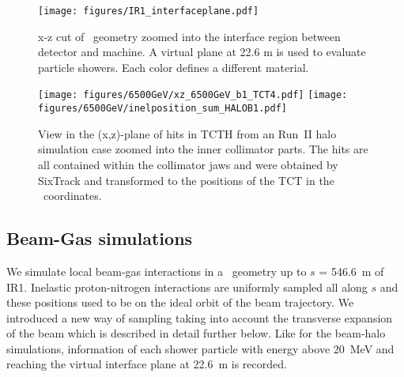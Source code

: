 

\begin{figure}%
\begin{center}
\texttt{[image: figures/IR1\_interfaceplane.pdf]}
\end{center}
\vspace{-0.6cm}
 \caption{x-z cut of \fluka~geometry zoomed into the interface region between detector and machine. A virtual plane at 22.6 m is used to evaluate particle showers. Each color defines a different material.
  \label{flukaGeo_nominal}}
\end{figure}


\begin{figure}%
\begin{center}
  \texttt{[image: figures/6500GeV/xz\_6500GeV\_b1\_TCT4.pdf]}
  \texttt{[image: figures/6500GeV/inelposition\_sum\_HALOB1.pdf]}
\end{center}
\vspace{-0.6cm}
 \caption{View in the (x,z)-plane of hits in TCTH from an Run~II halo simulation case zoomed into the inner collimator parts. The hits are all contained within the collimator jaws and were obtained by SixTrack and transformed to the positions of the TCT in the \fluka~coordinates.
  \label{tctHits}}
\end{figure}


\subsection{Beam-Gas simulations \label{BGdescript}}

We simulate local beam-gas interactions in a \fluka~geometry up to $s$ = 546.6~m of IR1. Inelastic proton-nitrogen interactions are uniformly sampled all along $s$ and these positions used to be on the ideal orbit of the beam trajectory. We introduced a new way of sampling taking into account the transverse expansion of the beam which is described in detail further below.
Like for the beam-halo simulations, information of each shower particle with energy above 20~MeV and reaching the virtual interface plane at 22.6~m is recorded.

